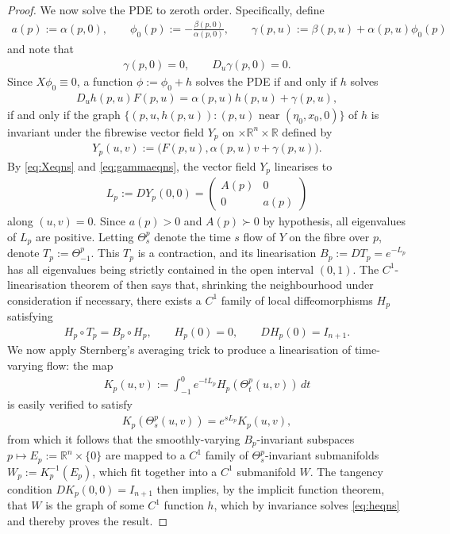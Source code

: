 \documentclass{article}
\newcommand{\RB}{\mathbb{R}}
\theoremstyle{plain}
\theoremstyle{definition}
\theoremstyle{remark}
\begin{document}
\begin{proof}
We now solve the PDE to zeroth order. Specifically, define
\begin{align}
a(p):=\alpha(p,0),\qquad \phi_0(p):=-\frac{\beta(p,0)}{\alpha(p,0)},\qquad \gamma(p,u):=\beta(p,u) +\alpha(p,u)\phi_0(p)
\end{align}
and note that
\begin{align}\label{eq:gammaeqns}
\gamma(p,0) = 0,\qquad D_u\gamma(p,0) = 0.
\end{align}
Since $X\phi_0\equiv 0$, a function $\phi:=\phi_0 + h$ solves the PDE if and only if $h$ solves
\begin{align}\label{eq:heqns}
D_uh(p,u)F(p,u) = \alpha(p,u)h(p,u) + \gamma(p,u),
\end{align}
if and only if the graph $\{(p,u,h(p,u)):(p,u)\text{ near $(\eta_0,x_0,0)$}\}$ of $h$ is invariant under the fibrewise vector field $Y_p$ on $\times\RB^n\times\RB$ defined by
\begin{align}
Y_p(u,v):=\big(F(p,u),\alpha(p,u)v + \gamma(p,u)).
\end{align}
By \eqref{eq:Xeqns} and \eqref{eq:gammaeqns}, the vector field $Y_p$ linearises to
\begin{align}
L_p:=DY_p(0,0) = \begin{pmatrix} A(p)& 0 \\ 0 & a(p)\end{pmatrix}
\end{align}
along $(u,v) = 0$. Since $a(p)>0$ and $A(p)\succ 0$ by hypothesis, all eigenvalues of $L_p$ are positive. Letting $\Theta^p_{s}$ denote the time $s$ flow of $Y$ on the fibre over $p$, denote $T_p:=\Theta^p_{-1}$. This $T_p$ is a contraction, and its linearisation $B_p:=DT_p = e^{-L_p}$ has all eigenvalues being strictly contained in the open interval $(0,1)$. The $C^1$-linearisation theorem of \cite[Theorem 2.5.7]{belitskii1978} then says that, shrinking the neighbourhood under consideration if necessary, there exists a $C^1$ family of local diffeomorphisms $H_p$ satisfying
\begin{align}
H_p\circ T_p= B_p\circ H_p,\qquad H_p(0) = 0,\qquad DH_p(0) = I_{n+1}.
\end{align}
We now apply Sternberg's averaging trick \cite{sternberg1957} to produce a linearisation of time-varying flow: the map
\begin{align}
K_p(u,v):=\int_{-1}^0e^{-tL_p}H_p(\Theta^p_t(u,v))\,dt
\end{align}
is easily verified to satisfy
\begin{align}
K_p(\Theta^p_s(u,v)) = e^{sL_p}K_p(u,v),
\end{align}
from which it follows that the smoothly-varying $B_p$-invariant subspaces $p\mapsto E_p:=\RB^n\times\{0\}$ are mapped to a $C^1$ family of $\Theta^p_s$-invariant submanifolds $W_p:=K_p^{-1}(E_p)$, which fit together into a $C^1$ submanifold $W$. The tangency condition $DK_p(0,0) = I_{n+1}$ then implies, by the implicit function theorem, that $W$ is the graph of some $C^1$ function $h$, which by invariance solves \eqref{eq:heqns} and thereby proves the result.
\end{proof}
\end{document}
